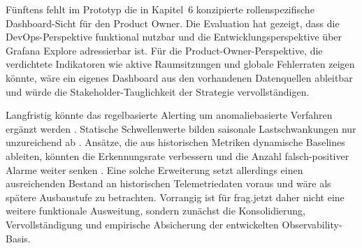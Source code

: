 Fünftens fehlt im Prototyp die in Kapitel~6 konzipierte rollenspezifische Dashboard-Sicht für den Product Owner. Die Evaluation hat gezeigt, dass die DevOps-Perspektive funktional nutzbar und die Entwicklungsperspektive über Grafana Explore adressierbar ist. Für die Product-Owner-Perspektive, die verdichtete Indikatoren wie aktive Raumsitzungen und globale Fehlerraten zeigen könnte, wäre ein eigenes Dashboard aus den vorhandenen Datenquellen ableitbar und würde die Stakeholder-Tauglichkeit der Strategie vervollständigen.
 
Langfristig könnte das regelbasierte Alerting um anomaliebasierte Verfahren ergänzt werden \parencite[S.~40]{mistry2025future}. Statische Schwellenwerte bilden saisonale Lastschwankungen nur unzureichend ab \parencite[S.~174]{vinnakota2025creating}. Ansätze, die aus historischen Metriken dynamische Baselines ableiten, könnten die Erkennungsrate verbessern und die Anzahl falsch-positiver Alarme weiter senken \parencite[S.~75]{alsubaie2025exploring}. Eine solche Erweiterung setzt allerdings einen ausreichenden Bestand an historischen Telemetriedaten voraus \parencite[S.~273]{abieba2025advanced} und wäre als spätere Ausbaustufe zu betrachten. Vorrangig ist für frag.jetzt daher nicht eine weitere funktionale Ausweitung, sondern zunächst die Konsolidierung, Vervollständigung und empirische Absicherung der entwickelten Observability-Basis.